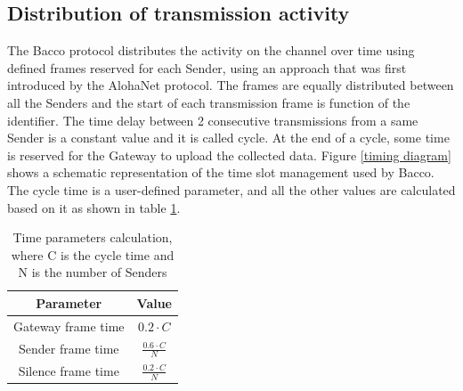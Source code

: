 \subsection{Distribution of transmission activity}
The Bacco protocol distributes the activity on the channel over time using defined frames reserved for each Sender, using
an approach that was first introduced by the AlohaNet\cite{alohanet} protocol. The frames are equally distributed between
all the Senders and the start of each transmission frame is function of the identifier. The time delay between 2 consecutive
transmissions from a same Sender is a constant value and it is called cycle. At the end of a cycle, some time is
reserved for the Gateway to upload the collected data. Figure \ref{timing diagram} shows a schematic representation of
the time slot management used by Bacco. The cycle time is a user-defined parameter, and all the other values are
calculated based on it as shown in table \ref{timing table}. \\

\begin{table}[ht]
    \centering
    \setlength{\extrarowheight}{5pt}
    \begin{tabular}{ |c|c| }
        \hline
        \textbf{Parameter} & \textbf{Value}\\
        \hline
        Gateway frame time & $0.2 \cdot C$\\
        \hline
        Sender frame time & $\frac{0.6 \cdot C}{N}$\\
        \hline
        Silence frame time & $\frac{0.2 \cdot C}{N}$\\
        \hline
    \end{tabular}
    \caption{Time parameters calculation, where C is the cycle time and N is the number of Senders}
    \label{timing table}
\end{table}

